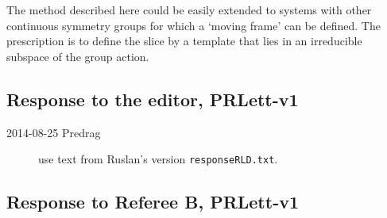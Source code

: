 The method described here could be easily extended to systems with other
continuous symmetry groups for which a `moving
frame' can be defined. The
prescription is to define the slice by a template that lies in an
irreducible subspace of the group action.

\subsection{Response to the editor, PRLett-v1}


\begin{description}
\item[2014-08-25 Predrag]
use text from Ruslan's version \texttt{responseRLD.txt}.

\end{description}


\subsection{Response to Referee B, PRLett-v1}

